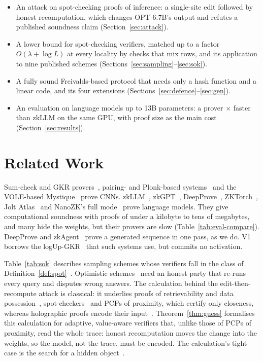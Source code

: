 \begin{itemize}
  \item An attack on spot-checking proofs of inference: a single-site edit followed by honest
  recomputation, which changes OPT-6.7B's output and refutes a published soundness claim
  (Section~\ref{sec:attack}).
  \item A lower bound for spot-checking verifiers, matched up to a factor $O(\lambda+\log L)$
  at every locality by checks that mix rows, and its application to nine published schemes
  (Sections~\ref{sec:sampling}--\ref{sec:sok}).
  \item A fully sound Freivalds-based protocol that needs only a hash function and a linear code,
  and its four extensions (Sections~\ref{sec:defence}--\ref{sec:gen}).
  \item An evaluation on language models up to 13B parameters: a prover
  \ZkllmSameGpuFactorRange{}$\times$ faster than zkLLM on the same GPU, with proof size as the main
  cost (Section~\ref{sec:results}).
\end{itemize}

\section{Related Work}
\label{sec:related}

 Sum-check and GKR provers~\cite{gkr,zkcnn,zkpytorch,verfcnn},
pairing- and Plonk-based systems~\cite{vcnn,zen,zeno,zkml,ezkl,bionetta} and the VOLE-based
Mystique~\cite{mystique} prove CNNs. zkLLM~\cite{zkllm}, zkGPT~\cite{zkgpt},
DeepProve~\cite{deepprove}, ZKTorch~\cite{zktorch}, Jolt Atlas~\cite{joltatlas} and NanoZK's full
mode~\cite{nanozk} prove language models. They give computational soundness with proofs of under a
kilobyte to tens of megabytes, and many hide the weights, but their provers are slow
(Table~\ref{tab:eval-compare}). DeepProve and zkAgent~\cite{zkagent} prove a generated sequence in
one pass, as we do. V1 borrows the logUp-GKR~\cite{papini2023logupgkr} that such systems use, but
commits no activation.

 Table~\ref{tab:sok} describes sampling schemes whose verifiers
fall in the class of
Definition~\ref{def:spot}~\cite{anchuri2026verifiable,slp,commitllm2026,tensorcommitments,nanozk,spex,immaculate,toploc,svip}.
Optimistic schemes~\cite{verde,opml,tao} need an honest party that re-runs every query and
disputes wrong answers. The calculation behind the
edit-then-recompute attack is classical: it underlies proofs of retrievability and data
possession~\cite{juels2007por,ateniese2007pdp}, spot-checkers~\cite{ergun2000spotcheckers} and PCPs
of proximity, which certify only closeness, whereas holographic proofs encode their
input~\cite{bghsv2006robust,bfls1991,chiesa2020fractal}. Theorem~\ref{thm:guess} formalises this
calculation for adaptive, value-aware verifiers that, unlike those of PCPs of proximity,
read the whole trace: honest recomputation moves the change into the weights, so the model, not
the trace, must be encoded. The calculation's tight case is the search for a hidden
object~\cite{chew1967,kadane1971}.

